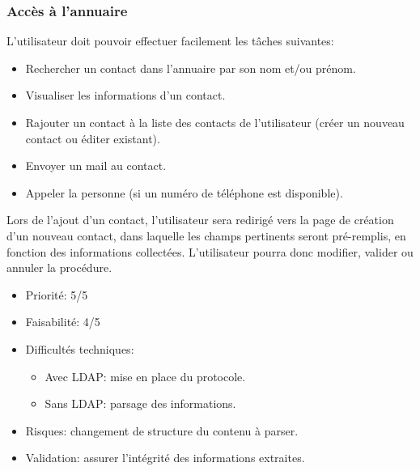 \documentclass [pdftex,12pt] {report}
\begin{document}
\subsubsection{Accès à l'annuaire}
L'utilisateur doit pouvoir effectuer facilement les tâches suivantes:
\begin{itemize}
\renewcommand{\labelitemi}{$\bullet$}
\item Rechercher un contact dans l'annuaire par son nom et/ou prénom.
\item Visualiser les informations d'un contact.
\item Rajouter un contact à la liste des contacts de l'utilisateur (créer un nouveau contact ou éditer existant).
\item Envoyer un mail au contact.
\item Appeler la personne (si un numéro de téléphone est disponible).
\end{itemize}
Lors de l'ajout d'un contact, l'utilisateur sera redirigé vers la page de création d'un nouveau contact, dans laquelle les champs pertinents seront pré-remplis, en fonction des informations collectées. L'utilisateur pourra donc modifier, valider ou annuler la procédure. \\

\begin{itemize}
\renewcommand{\labelitemi}{$\bullet$}
\item Priorité: 5/5
\item Faisabilité: 4/5
\item Difficultés techniques:
\begin{itemize}
\item Avec LDAP: mise en place du protocole.
\item Sans LDAP: parsage des informations.
\end{itemize} 
\item Risques: changement de structure du contenu à parser.
\item Validation: assurer l'intégrité des informations extraites.
\end{itemize}
\end{document}
